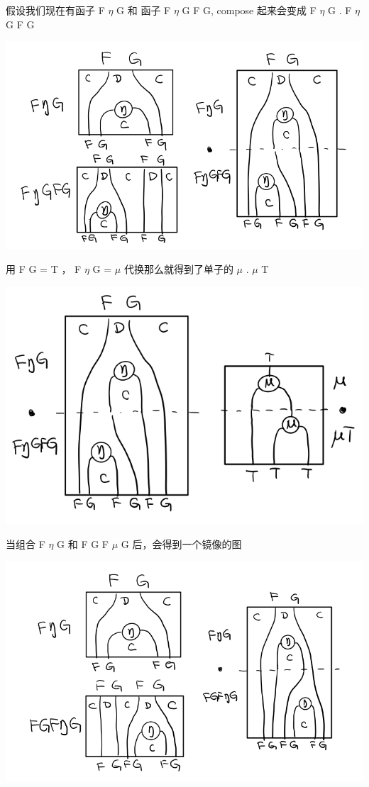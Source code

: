 \documentclass[11pt]{tufte-book}
\begin{document}
假设我们现在有函子 F \(\eta\) G 和 函子 F \(\eta\) G F G, compose 起来会变成  F \(\eta\) G . F \(\eta\) G F G
\begin{center}
\includegraphics[width=.9\linewidth]{images/p1-ajunction-functor-monad-laws-1.png}
\end{center}

用 F G = T ， F \(\eta\) G = \(\mu\) 代换那么就得到了单子的 \(\mu\) . \(\mu\) T
\begin{center}
\includegraphics[width=.9\linewidth]{images/p1-ajunction-functor-monad-laws-2.png}
\end{center}

当组合 F \(\eta\) G 和 F G F \(\mu\) G 后，会得到一个镜像的图
\begin{center}
\includegraphics[width=.9\linewidth]{images/p1-ajunction-functor-monad-laws-3.png}
\end{center}
\end{document}
